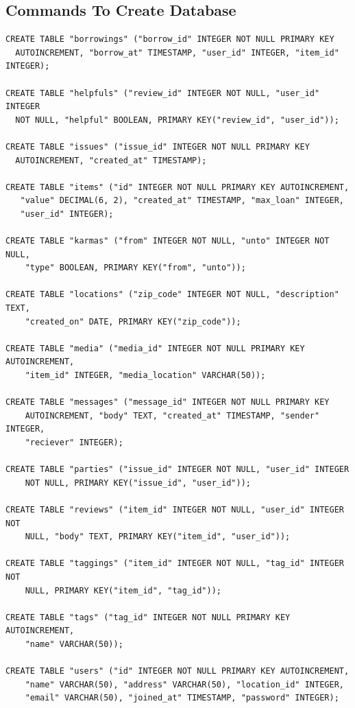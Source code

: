 \documentclass[12pt]{article}
\begin{document}
\subsection*{Commands To Create Database}
\begin{verbatim}
CREATE TABLE "borrowings" ("borrow_id" INTEGER NOT NULL PRIMARY KEY 
  AUTOINCREMENT, "borrow_at" TIMESTAMP, "user_id" INTEGER, "item_id" INTEGER);

CREATE TABLE "helpfuls" ("review_id" INTEGER NOT NULL, "user_id" INTEGER 
  NOT NULL, "helpful" BOOLEAN, PRIMARY KEY("review_id", "user_id"));

CREATE TABLE "issues" ("issue_id" INTEGER NOT NULL PRIMARY KEY 
  AUTOINCREMENT, "created_at" TIMESTAMP);

CREATE TABLE "items" ("id" INTEGER NOT NULL PRIMARY KEY AUTOINCREMENT, 
   "value" DECIMAL(6, 2), "created_at" TIMESTAMP, "max_loan" INTEGER, 
   "user_id" INTEGER);

CREATE TABLE "karmas" ("from" INTEGER NOT NULL, "unto" INTEGER NOT NULL, 
    "type" BOOLEAN, PRIMARY KEY("from", "unto"));

CREATE TABLE "locations" ("zip_code" INTEGER NOT NULL, "description" TEXT, 
    "created_on" DATE, PRIMARY KEY("zip_code"));

CREATE TABLE "media" ("media_id" INTEGER NOT NULL PRIMARY KEY AUTOINCREMENT, 
    "item_id" INTEGER, "media_location" VARCHAR(50));

CREATE TABLE "messages" ("message_id" INTEGER NOT NULL PRIMARY KEY 
    AUTOINCREMENT, "body" TEXT, "created_at" TIMESTAMP, "sender" INTEGER, 
    "reciever" INTEGER);

CREATE TABLE "parties" ("issue_id" INTEGER NOT NULL, "user_id" INTEGER 
    NOT NULL, PRIMARY KEY("issue_id", "user_id"));

CREATE TABLE "reviews" ("item_id" INTEGER NOT NULL, "user_id" INTEGER NOT 
    NULL, "body" TEXT, PRIMARY KEY("item_id", "user_id"));

CREATE TABLE "taggings" ("item_id" INTEGER NOT NULL, "tag_id" INTEGER NOT 
    NULL, PRIMARY KEY("item_id", "tag_id"));

CREATE TABLE "tags" ("tag_id" INTEGER NOT NULL PRIMARY KEY AUTOINCREMENT, 
    "name" VARCHAR(50));

CREATE TABLE "users" ("id" INTEGER NOT NULL PRIMARY KEY AUTOINCREMENT, 
    "name" VARCHAR(50), "address" VARCHAR(50), "location_id" INTEGER, 
    "email" VARCHAR(50), "joined_at" TIMESTAMP, "password" INTEGER);
\end{verbatim}
\end{document}
